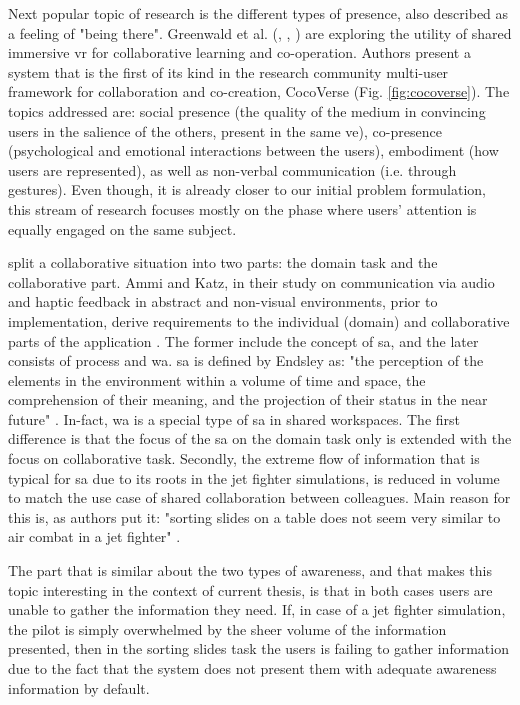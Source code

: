 Next popular topic of research is the different types of presence, also described as a feeling of "being there".
Greenwald et al. (\cite{greenwald_cocoverse_nodate}, \cite{greenwald_investigating_2017}, \cite{greenwald_technology_2017}) are exploring the utility of shared immersive \gls{vr} for collaborative learning and co-operation. Authors present a system that is the first of its kind in the research community multi-user framework for collaboration and co-creation, CocoVerse (Fig. \ref{fig:cocoverse}). The topics addressed are: social presence (the quality of the medium in convincing users in the salience of the others, present in the same \gls{ve}), co-presence (psychological and emotional interactions between the users), embodiment (how users are represented), as well as non-verbal communication (i.e. through gestures).
Even though, it is already closer to our initial problem formulation, this stream of research focuses mostly on the phase where users' attention is equally engaged on the same subject.

\cite{gutwin_descriptive_2002} split a collaborative situation into two parts: the domain task and the collaborative part. Ammi and Katz, in their study on communication via audio and haptic feedback in abstract and non-visual environments, prior to implementation, derive requirements to the individual (domain) and collaborative parts of the application \cite{ammi_intermodal_2015}. The former include the concept of \gls{sa}, and the later consists of process and \gls{wa}.
\gls{sa} is defined by Endsley as: "the perception of the elements in the environment within a volume of time and space, the comprehension of their meaning, and the projection of their status in the near future" \cite{endsley_situation_1988}. In-fact, \gls{wa} is a special type of \gls{sa} in shared workspaces. The first difference is that the focus of the \gls{sa} on the domain task only is extended with the focus on collaborative task. Secondly, the extreme flow of information that is typical for \gls{sa} due to its roots in the jet fighter simulations, is reduced in volume to match the use case of shared collaboration between colleagues. Main reason for this is, as authors put it: "sorting slides on a table does not seem very similar to air combat in a jet fighter" \cite{gutwin_descriptive_2002}.

The part that is similar about the two types of awareness, and that makes this topic interesting in the context of current thesis, is that in both cases users are unable to gather the information they need. If, in case of a jet fighter simulation, the pilot is simply overwhelmed by the sheer volume of the information presented, then in the sorting slides task the users is failing to gather information due to the fact that the system does not present them with adequate awareness information by default.

